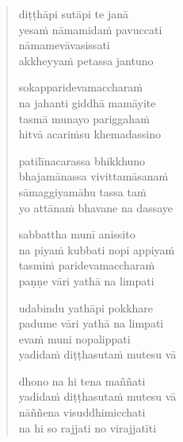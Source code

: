 \clearpage
\begin{verse}

diṭṭhāpi sutāpi te janā\\
yesaṁ nāmamidaṁ pavuccati\\
nāmamevāvasissati\\
akkheyyaṁ petassa jantuno

sokapparidevamaccharaṁ\\
na jahanti giddhā mamāyite\\
tasmā munayo pariggahaṁ\\
hitvā acariṁsu khemadassino

patilīnacarassa bhikkhuno\\
bhajamānassa vivittamāsanaṁ\\
sāmaggiyamāhu tassa taṁ\\
yo attānaṁ bhavane na dassaye

sabbattha munī anissito\\
na piyaṁ kubbati nopi appiyaṁ\\
tasmiṁ paridevamaccharaṁ\\
paṇṇe vāri yathā na limpati

udabindu yathāpi pokkhare\\
padume vāri yathā na limpati\\
evaṁ muni nopalippati\\
yadidaṁ diṭṭhasutaṁ mutesu vā

dhono na hi tena maññati\\
yadidaṁ diṭṭhasutaṁ mutesu vā\\
nāññena visuddhimicchati\\
na hi so rajjati no virajjatīti

\end{verse}


